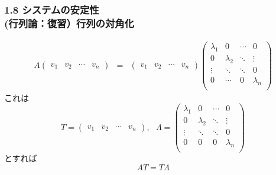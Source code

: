 \documentclass[10pt]{beamer}
\begin{document}
\begin{frame}[t]
\frametitle{1.8 システムの安定性 \\
 (行列論：復習）行列の対角化}
 

\addtocounter{equation}{-1}
\begin{align}
 A
 \left(
 \begin{array}{cccc}
  v_1 & v_2 & \cdots & v_n
 \end{array}
 \right)
 &=&
 \left(
 \begin{array}{cccc}
  v_1 & v_2 & \cdots & v_n
 \end{array}
 \right)
 \left(
 \begin{array}{cccc}
  \lambda_1 & 0         & \cdots & 0 \\
   0        & \lambda_2 & \ddots & \vdots \\
   \vdots   & \ddots    & \ddots & 0 \\
   0        & \cdots    & 0      & \lambda_n \\
 \end{array}
 \right)
\end{align}
これは
\begin{equation}
  T =
  \left(
  \begin{array}{cccc}
    v_1 & v_2 & \cdots & v_n
  \end{array}
  \right)
  , \ \ \
  \Lambda =
  \left(
  \begin{array}{cccc}
    \lambda_1 & 0        & \cdots & 0 \\
    0        & \lambda_2 & \ddots & \vdots \\
    \vdots   & \ddots    & \ddots & 0\\
    0        & 0         & 0       & \lambda_n \\
  \end{array}
  \right)
\end{equation}
とすれば
\begin{equation}
  AT = T \Lambda
\end{equation}
\end{frame}
\end{document}
